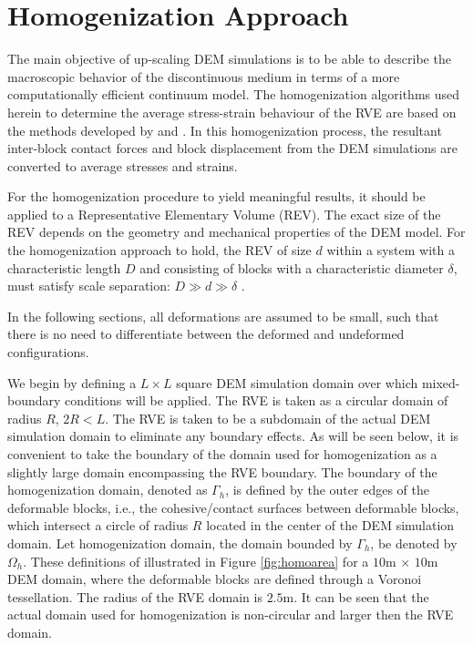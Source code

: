 \section{Homogenization Approach}

The main objective of up-scaling DEM simulations is to be able to describe the macroscopic behavior of the discontinuous medium in terms of a more computationally efficient continuum model. The homogenization algorithms used herein to determine the average stress-strain behaviour of the RVE are based on the methods developed by \citet{daddetta_particle_2004} and \citet{wellmann_homogenization_2008}. In this homogenization process, the resultant inter-block contact forces and block displacement from the DEM simulations are converted to average stresses and strains.

For the homogenization procedure to yield meaningful results, it should be applied to a Representative Elementary Volume (REV). The exact size of the REV depends on the geometry and mechanical properties of the DEM model. For the homogenization approach to hold, the REV of size $d$ within a system with a characteristic length $D$ and consisting of blocks with a characteristic diameter $\delta$, must satisfy scale separation: $D\gg d\gg\delta$ \citep{wellmann_homogenization_2008}. 

In the following sections, all deformations are assumed to be small, such that there is no need to differentiate between the deformed and undeformed configurations.  

We begin by defining a $L\times L$ square DEM simulation domain over which mixed-boundary conditions will be applied. The RVE is taken as a circular domain of radius $R$, $2R<L$.  The RVE is taken to be a subdomain of the actual DEM simulation domain to eliminate any boundary effects.  As will be seen below, it is convenient to take the boundary of the domain used for homogenization as a slightly large domain encompassing the RVE boundary. The boundary of the homogenization domain, denoted as $\Gamma_h$, is defined by the outer edges of the deformable blocks, i.e., the cohesive/contact surfaces between deformable blocks, which intersect a circle of radius $R$ located in the center of the DEM simulation domain. Let homogenization domain, the domain bounded by $\Gamma_h$, be denoted by $\Omega_h$. These definitions of illustrated in Figure \ref{fig:homoarea} for a $10$m $\times$ $10$m DEM domain, where the deformable blocks are defined through a Voronoi tessellation. The radius of the RVE domain is $2.5$m.  It can be seen that the actual domain used for homogenization is non-circular and larger then the RVE domain. 


